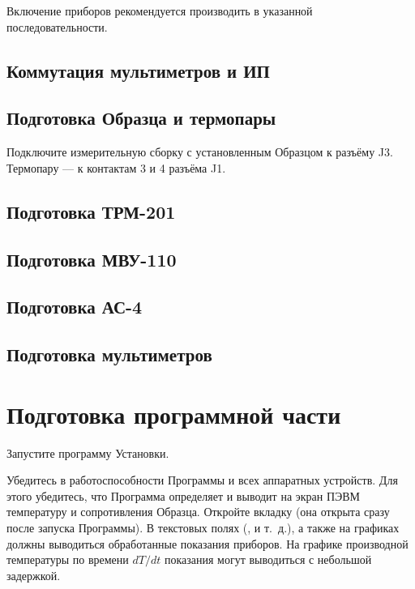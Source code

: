 \documentclass[12pt, a4paper, twocolumn]{report}
\begin{document}
Включение приборов рекомендуется производить в указанной последовательности.

\subsection{Коммутация мультиметров и ИП}



\subsection{Подготовка Образца и термопары}

Подключите измерительную сборку с установленным Образцом к разъёму J3. Термопару --- к контактам 3 и 4 разъёма J1.

\subsection{Подготовка ТРМ-201}



\subsection{Подготовка МВУ-110}



\subsection{Подготовка АС-4}



\subsection{Подготовка мультиметров}



\section{Подготовка программной части}

Запустите программу Установки.

Убедитесь в работоспособности Программы и всех аппаратных устройств. Для этого убедитесь, что Программа определяет и выводит на экран ПЭВМ температуру и сопротивления Образца. Откройте вкладку  (она открыта сразу после запуска Программы). В текстовых полях (,  и т.~д.), а также на графиках должны выводиться обработанные показания приборов. На графике производной температуры по времени $dT/dt$ показания могут выводиться с небольшой задержкой.
\end{document}

